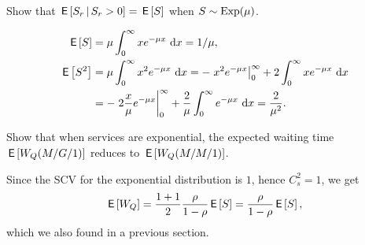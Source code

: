 \begin{exercise}[\faCalculator]
 Show that $\,\mathsf{E}\left[S_r\,\middle|\, S_r>0\right] = \,\mathsf{E}\left[S\right]$ when $S\sim \operatorname{Exp}(\mu)$.
\begin{solution}
    \begin{align*}
\,\mathsf{E}\left[S\right] &= \mu \int_0^\infty x e^{-\mu x}\,\,\text{d}x = 1/\mu, \\
\,\mathsf{E}\left[S^2\right] 
&= \mu \int_0^\infty x^2 e^{- \mu x} \,\,\text{d}x = - \left. x^2 e^{-\mu x} \right|_0^\infty + 2 \int_0^\infty x e^{-\mu x} \, \,\text{d}x \\
&= -\left. 2\frac x \mu e^{-\mu x} \right|_0^\infty + \frac 2 \mu\int_0^\infty e^{-\mu x} \, \,\text{d}x =\frac2{\mu^2}.
    \end{align*}
\end{solution}
\end{exercise}


\begin{exercise}[\faFlask]
  Show that when services are exponential, the expected waiting time
  $\,\mathsf{E}\left[W_Q(M/G/1)\right]$ reduces to $\,\mathsf{E}\left[W_Q(M/M/1)\right]$.
    \begin{solution}
      Since the SCV for the exponential distribution is $1$, hence
      $C_s^2=1$, we get 
    \begin{equation*}
\,\mathsf{E}\left[W_Q\right] = \frac{1+1}2\frac{\rho}{1-\rho} \,\mathsf{E}\left[S\right] = \frac{\rho}{1-\rho} \,\mathsf{E}\left[S\right],
    \end{equation*}
which we also found in a previous section.
    \end{solution}
\end{exercise}


